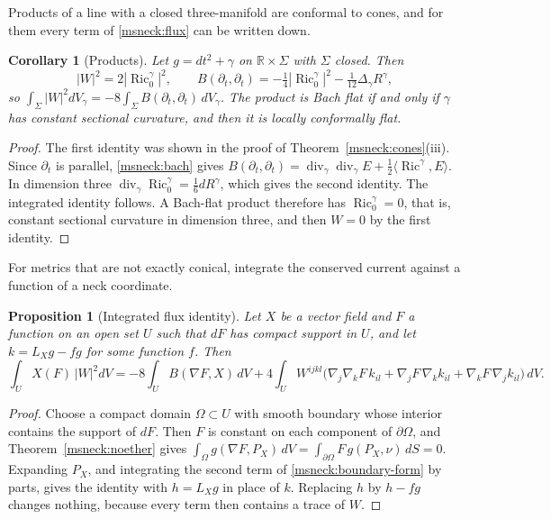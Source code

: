 \documentclass[11pt]{article}
\numberwithin{equation}{section}
\newtheorem{proposition}[theorem]{Proposition}
\newtheorem{corollary}[theorem]{Corollary}
\theoremstyle{definition}
\theoremstyle{remark}
\DeclareMathOperator{\Ric}{Ric}
\begin{document}
Products of a line with a closed three-manifold are conformal to cones,
and for them every term of \eqref{msneck:flux} can be written down.

\begin{corollary}[Products]\label{msneck:products}
Let \(g=dt^2+\gamma\) on \(\mathbb R\times\Sigma\) with \(\Sigma\) closed.
Then
\[
 |W|^2=2|\Ric_0^\gamma|^2,\qquad
 B(\partial_t,\partial_t)=-\tfrac14|\Ric_0^\gamma|^2-\tfrac1{12}\Delta_\gamma R^\gamma,
\]
so \(\int_\Sigma|W|^2dV_\gamma=-8\int_\Sigma B(\partial_t,\partial_t)\,dV_\gamma\).
The product is Bach flat if and only if \(\gamma\) has constant sectional
curvature, and then it is locally conformally flat.
\end{corollary}

\begin{proof}
The first identity was shown in the proof of
Theorem~\ref{msneck:cones}(iii). Since \(\partial_t\) is parallel,
\eqref{msneck:bach} gives
\(B(\partial_t,\partial_t)=\operatorname{div}_\gamma\operatorname{div}_\gamma E
+\tfrac12\langle\Ric^\gamma,E\rangle\). In dimension three
\(\operatorname{div}_\gamma\Ric_0^\gamma=\tfrac16dR^\gamma\), which gives the
second identity. The integrated identity follows. A Bach-flat product
therefore has \(\Ric_0^\gamma=0\), that is, constant sectional curvature
in dimension three, and then \(W=0\) by the first identity.
\end{proof}

For metrics that are not exactly conical, integrate the conserved
current against a function of a neck coordinate.

\begin{proposition}[Integrated flux identity]\label{msneck:integrated}
Let \(X\) be a vector field and \(F\) a function on an open set \(U\)
such that \(dF\) has compact support in \(U\), and let
\(k=L_Xg-fg\) for some function \(f\). Then
\[
 \int_UX(F)\,|W|^2dV=-8\int_UB(\nabla F,X)\,dV
 +4\int_UW^{ijkl}\bigl(\nabla_j\nabla_kF\,k_{il}+\nabla_jF\,\nabla_kk_{il}
 +\nabla_kF\,\nabla_jk_{il}\bigr)\,dV .
\]
\end{proposition}

\begin{proof}
Choose a compact domain \(\Omega\subset U\) with smooth boundary whose
interior contains the support of \(dF\). Then \(F\) is constant on each
component of \(\partial\Omega\), and Theorem~\ref{msneck:noether} gives
\(\int_\Omega g(\nabla F,P_X)\,dV=\int_{\partial\Omega}F\,g(P_X,\nu)\,dS=0\).
Expanding \(P_X\), and integrating the second term of
\eqref{msneck:boundary-form} by parts, gives the identity with
\(h=L_Xg\) in place of \(k\). Replacing \(h\) by \(h-fg\) changes nothing,
because every term then contains a trace of \(W\).
\end{proof}
\end{document}
